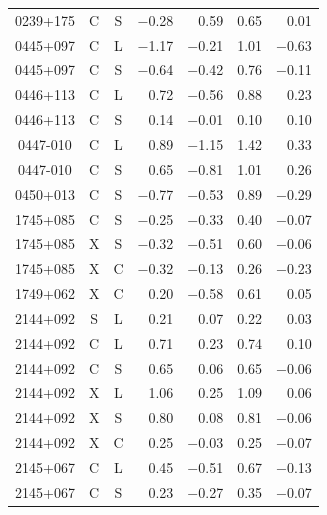 \begin{table}
{\begin{tabular}{|c|c|c|r|r|r|r|}
 0239+175 &     C &     S &       $-$0.28 &           0.59 &      0.65 &     0.01 \\
 0445+097 &     C &     L &       $-$1.17 &        $-$0.21 &      1.01 &  $-$0.63 \\
 0445+097 &     C &     S &       $-$0.64 &        $-$0.42 &      0.76 &  $-$0.11 \\
 0446+113 &     C &     L &          0.72 &        $-$0.56 &      0.88 &     0.23 \\
 0446+113 &     C &     S &          0.14 &        $-$0.01 &      0.10 &     0.10 \\
 0447-010 &     C &     L &          0.89 &        $-$1.15 &      1.42 &     0.33 \\
 0447-010 &     C &     S &          0.65 &        $-$0.81 &      1.01 &     0.26 \\
 0450+013 &     C &     S &       $-$0.77 &        $-$0.53 &      0.89 &  $-$0.29 \\
 1745+085 &     C &     S &       $-$0.25 &        $-$0.33 &      0.40 &  $-$0.07 \\
 1745+085 &     X &     S &       $-$0.32 &        $-$0.51 &      0.60 &  $-$0.06 \\
 1745+085 &     X &     C &       $-$0.32 &        $-$0.13 &      0.26 &  $-$0.23 \\
 1749+062 &     X &     C &          0.20 &        $-$0.58 &      0.61 &     0.05 \\
 2144+092 &     S &     L &          0.21 &           0.07 &      0.22 &     0.03 \\
 2144+092 &     C &     L &          0.71 &           0.23 &      0.74 &     0.10 \\
 2144+092 &     C &     S &          0.65 &           0.06 &      0.65 &  $-$0.06 \\
 2144+092 &     X &     L &          1.06 &           0.25 &      1.09 &     0.06 \\
 2144+092 &     X &     S &          0.80 &           0.08 &      0.81 &  $-$0.06 \\
 2144+092 &     X &     C &          0.25 &        $-$0.03 &      0.25 &  $-$0.07 \\
 2145+067 &     C &     L &          0.45 &        $-$0.51 &      0.67 &  $-$0.13 \\
 2145+067 &     C &     S &          0.23 &        $-$0.27 &      0.35 &  $-$0.07 \\
\hline
\end{tabular}}
\end{table}

